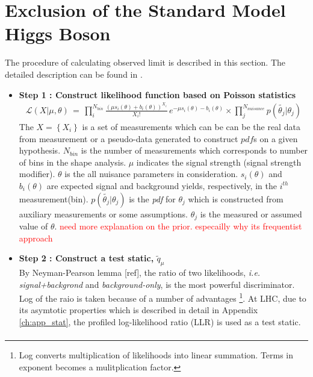 \section{Exclusion of the Standard Model Higgs Boson} 
The procedure of calculating observed limit is described in this section.
The detailed description can be found in \cite{combination_stat}.

\begin{itemize}
%
\item{\textbf{Step 1 : Construct likelihood function based on Poisson statistics} } \\
\begin{eqnarray} 
\mathcal{L} ( X | \mu, \theta) 
\, = \,
\prod_{i}^{N_{bin}} \frac{ \left( \mu s_i(\theta) + b_i(\theta) \right)^{X_i}}{X_i!} 
\, e^{ - \mu s_i(\theta) - b_i(\theta) }   \times
\prod_{j}^{N_{nuisance}} p\left( \tilde{\theta_j} | \theta_j \right)
\end{eqnarray}
The $X=\left\{X_i\right\}$ is a set of measurements which can be   
can be the real data from measurement or a pseudo-data generated 
to construct $pdf$s on a given hypothesis. $N_{bin}$ is the number of 
measurements which corresponds to number of bins in the shape analysis. 
$\mu$ indicates the signal strength (signal strength modifier).
$\theta$ is the all nuisance parameters in consideration. 
$s_i(\theta)$ and $b_i(\theta)$ are expected signal and background 
yields, respectively, in the $i^{th}$ measurement(bin).
$p\left( \tilde{\theta_j} | \theta_j \right)$ is the \textit{pdf} for 
$\theta_j$ which is constructed from auxiliary measurements or some  
assumptions. $\theta_j$ is the measured or assumed value of $\theta$. 
\textcolor{red}{need more explanation on the prior. 
especailly why its frequentist approach}  
%
\item{\textbf{Step 2 : Construct a test static, $\tilde{q}_\mu$} }  \\
By Neyman-Pearson lemma [ref], the ratio of two likelihoods, 
\textit{i.e. signal+backgrond} and \textit{background-only}, 
is the most powerful discriminator. 
Log of the raio is taken because of a number of advantages
\footnote{Log converts multiplication of likelihoods into linear summation. 
Terms in exponent becomes a mulitplication factor.}.  
At LHC, due to its asymtotic properties which is described in detail 
in Appendix \ref{ch:app_stat}, the profiled log-likelihood ratio (LLR) is used as a test static.   
\begin{eqnarray} 

\end{eqnarray}
\end{itemize}
